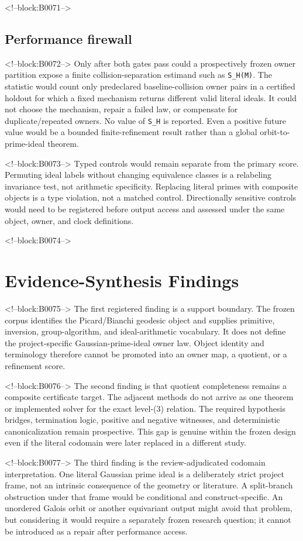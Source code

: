\documentclass[11pt,a4paper]{article}
\begin{document}
<!--block:B0071-->
\subsection{Performance firewall}

<!--block:B0072-->
Only after both gates pass could a prospectively frozen owner partition expose a finite collision-separation estimand such as \texttt{S\_H(M)}. The statistic would count only predeclared baseline-collision owner pairs in a certified holdout for which a fixed mechanism returns different valid literal ideals. It could not choose the mechanism, repair a failed law, or compensate for duplicate/repeated owners. No value of \texttt{S\_H} is reported. Even a positive future value would be a bounded finite-refinement result rather than a global orbit-to-prime-ideal theorem.

<!--block:B0073-->
Typed controls would remain separate from the primary score. Permuting ideal labels without changing equivalence classes is a relabeling invariance test, not arithmetic specificity. Replacing literal primes with composite objects is a type violation, not a matched control. Directionally sensitive controls would need to be registered before output access and assessed under the same object, owner, and clock definitions.

<!--block:B0074-->
\section{Evidence-Synthesis Findings}

<!--block:B0075-->
The first registered finding is a support boundary. The frozen corpus identifies the Picard/Bianchi geodesic object and supplies primitive, inversion, group-algorithm, and ideal-arithmetic vocabulary. It does not define the project-specific Gaussian-prime-ideal owner law. Object identity and terminology therefore cannot be promoted into an owner map, a quotient, or a refinement score.

<!--block:B0076-->
The second finding is that quotient completeness remains a composite certificate target. The adjacent methods do not arrive as one theorem or implemented solver for the exact level-(3) relation. The required hypothesis bridges, termination logic, positive and negative witnesses, and deterministic canonicalization remain prospective. This gap is genuine within the frozen design even if the literal codomain were later replaced in a different study.

<!--block:B0077-->
The third finding is the review-adjudicated codomain interpretation. One literal Gaussian prime ideal is a deliberately strict project frame, not an intrinsic consequence of the geometry or literature. A split-branch obstruction under that frame would be conditional and construct-specific. An unordered Galois orbit or another equivariant output might avoid that problem, but considering it would require a separately frozen research question; it cannot be introduced as a repair after performance access.
\end{document}
